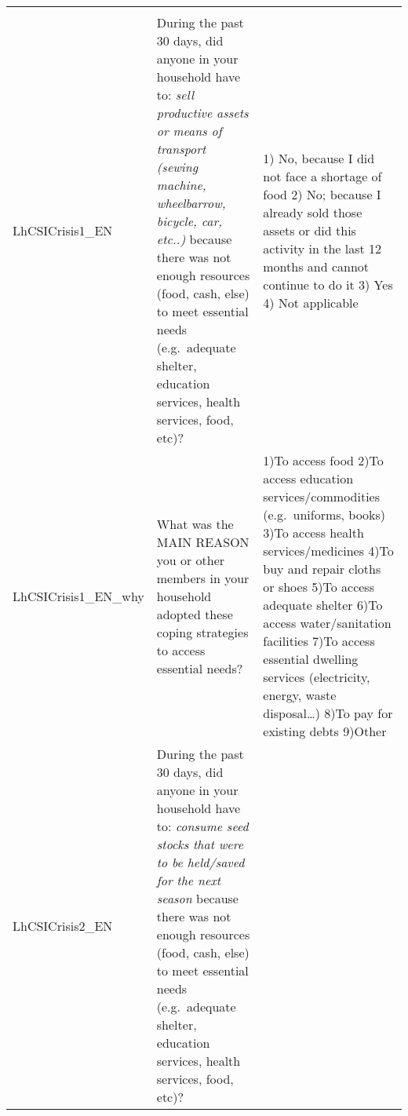 \documentclass[
]{book}
\begin{document}
\begin{longtable}[]{@{}lll@{}}
\begin{minipage}[t]{0.43\columnwidth}
\end{minipage}\tabularnewline
\begin{minipage}[t]{0.11\columnwidth}\raggedright
LhCSICrisis1\_EN\strut
\end{minipage} & \begin{minipage}[t]{0.37\columnwidth}\raggedright
During the past 30 days, did anyone in your household have to: \emph{sell productive assets or means of transport (sewing machine, wheelbarrow, bicycle, car, etc..)} because there was not enough resources (food, cash, else) to meet essential needs (e.g.~adequate shelter, education services, health services, food, etc)?\strut
\end{minipage} & \begin{minipage}[t]{0.43\columnwidth}\raggedright
1) No, because I did not face a shortage of food 2) No; because I already sold those assets or did this activity in the last 12 months and cannot continue to do it 3) Yes 4) Not applicable\strut
\end{minipage}\tabularnewline
\begin{minipage}[t]{0.11\columnwidth}\raggedright
LhCSICrisis1\_EN\_why\strut
\end{minipage} & \begin{minipage}[t]{0.37\columnwidth}\raggedright
What was the MAIN REASON you or other members in your household adopted these coping strategies to access essential needs?\strut
\end{minipage} & \begin{minipage}[t]{0.43\columnwidth}\raggedright
1)To access food 2)To access education services/commodities (e.g.~uniforms, books) 3)To access health services/medicines 4)To buy and repair cloths or shoes 5)To access adequate shelter 6)To access water/sanitation facilities 7)To access essential dwelling services (electricity, energy, waste disposal\ldots) 8)To pay for existing debts 9)Other\strut
\end{minipage}\tabularnewline
\begin{minipage}[t]{0.11\columnwidth}\raggedright
LhCSICrisis2\_EN\strut
\end{minipage} & \begin{minipage}[t]{0.37\columnwidth}\raggedright
During the past 30 days, did anyone in your household have to: \emph{consume seed stocks that were to be held/saved for the next season} because there was not enough resources (food, cash, else) to meet essential needs (e.g.~adequate shelter, education services, health services, food, etc)?\strut
\end{minipage} & \begin{minipage}[t]{0.43\columnwidth}\raggedright

\end{minipage}
\end{longtable}
\end{document}
